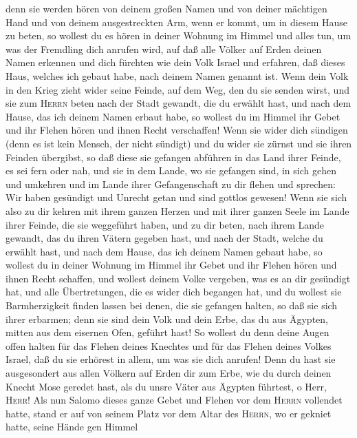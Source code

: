  denn sie werden hören von deinem großen Namen und von
deiner mächtigen Hand und von deinem ausgestreckten Arm, wenn er kommt,
um in diesem Hause zu beten,  so wollest du es hören in
deiner Wohnung im Himmel und alles tun, um was der Fremdling dich
anrufen wird, auf daß alle Völker auf Erden deinen Namen erkennen und
dich fürchten wie dein Volk Israel und erfahren, daß dieses Haus,
welches ich gebaut habe, nach deinem Namen genannt ist. 
Wenn dein Volk in den Krieg zieht wider seine Feinde, auf dem Weg, den
du sie senden wirst, und sie zum \textsc{Herrn} beten nach der Stadt
gewandt, die du erwählt hast, und nach dem Hause, das ich deinem Namen
erbaut habe,  so wollest du im Himmel ihr Gebet und ihr
Flehen hören und ihnen Recht verschaffen!  Wenn sie wider
dich sündigen (denn es ist kein Mensch, der nicht sündigt) und du wider
sie zürnst und sie ihren Feinden übergibst, so daß diese sie gefangen
abführen in das Land ihrer Feinde, es sei fern oder nah, 
und sie in dem Lande, wo sie gefangen sind, in sich gehen und umkehren
und im Lande ihrer Gefangenschaft zu dir flehen und sprechen: Wir haben
gesündigt und Unrecht getan und sind gottlos gewesen! 
Wenn sie sich also zu dir kehren mit ihrem ganzen Herzen und mit ihrer
ganzen Seele im Lande ihrer Feinde, die sie weggeführt haben, und zu dir
beten, nach ihrem Lande gewandt, das du ihren Vätern gegeben hast, und
nach der Stadt, welche du erwählt hast, und nach dem Hause, das ich
deinem Namen gebaut habe,  so wollest du in deiner
Wohnung im Himmel ihr Gebet und ihr Flehen hören und ihnen Recht
schaffen, und wollest deinem Volke vergeben, was es an dir gesündigt
hat,  und alle Übertretungen, die es wider dich begangen
hat, und du wollest sie Barmherzigkeit finden lassen bei denen, die sie
gefangen halten, so daß sie sich ihrer erbarmen;  denn
sie sind dein Volk und dein Erbe, das du aus Ägypten, mitten aus dem
eisernen Ofen, geführt hast!  So wollest du denn deine
Augen offen halten für das Flehen deines Knechtes und für das Flehen
deines Volkes Israel, daß du sie erhörest in allem, um was sie dich
anrufen!  Denn du hast sie ausgesondert aus allen Völkern
auf Erden dir zum Erbe, wie du durch deinen Knecht Mose geredet hast,
als du unsre Väter aus Ägypten führtest, o Herr, \textsc{Herr}!
 Als nun Salomo dieses ganze Gebet und Flehen vor dem
\textsc{Herrn} vollendet hatte, stand er auf von seinem Platz vor dem
Altar des \textsc{Herrn}, wo er gekniet hatte, seine Hände gen Himmel
